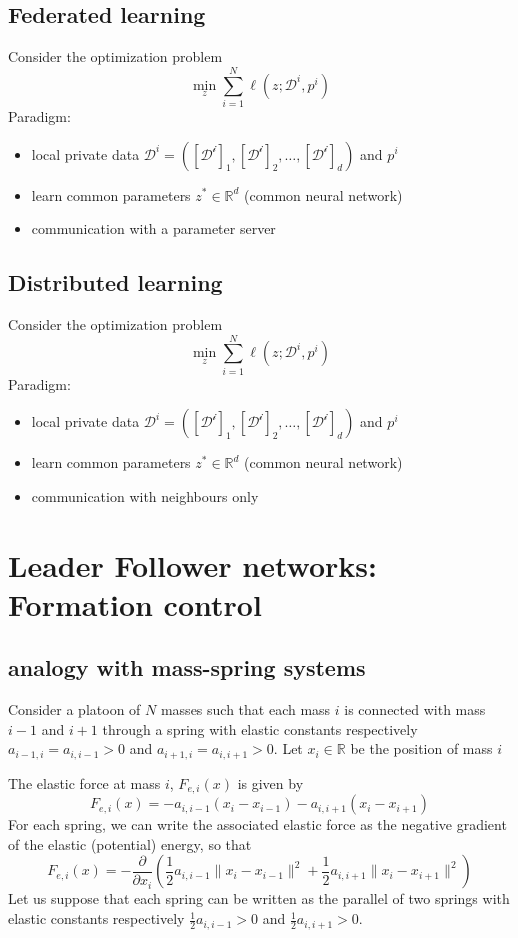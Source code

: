 \documentclass{book}
\newcommand{\R}{\mathbb{R}}
\theoremstyle{theoremv2}
\theoremstyle{defv2}
\theoremstyle{remark}
\theoremstyle{remark}
\theoremstyle{definition}
\theoremstyle{definition}
\begin{document}
\section{Federated learning}
Consider the optimization problem 
\[
    \min_z \displaystyle\sum_{i=1}^{N}\ell(z;\mathcal{D}^i,p^i)
\]
Paradigm:
\begin{itemize}
    \item local private data $\mathcal{D}^i = ([\mathcal{D^i}]_1,[\mathcal{D^i}]_2,\dots,[\mathcal{D^i}]_d)$ and $p^i$
    \item learn common parameters $z^*\in\R^d$ (common neural network)
    \item communication with a parameter server
\end{itemize}

\section{Distributed learning}
Consider the optimization problem 
\[
    \min_z \displaystyle\sum_{i=1}^{N}\ell(z;\mathcal{D}^i,p^i)
\]
Paradigm:
\begin{itemize}
    \item local private data $\mathcal{D}^i = ([\mathcal{D^i}]_1,[\mathcal{D^i}]_2,\dots,[\mathcal{D^i}]_d)$ and $p^i$
    \item learn common parameters $z^*\in\R^d$ (common neural network)
    \item communication with neighbours only
\end{itemize}



\chapter{Leader Follower networks: Formation control}
\section{analogy with mass-spring systems}
Consider a platoon of $N$ masses such that each mass $i$ is connected with mass $i-1$ and $i+1$ through a spring with elastic constants respectively $a_{i-1,i} = a_{i,i-1}>0$ and $a_{i+1,i} = a_{i,i+1}>0$. Let $x_i\in \R$ be the position of mass $i$

The elastic force at mass $i$, $F_{e,i}(x)$ is given by 
\[
    F_{e,i}(x) = -a_{i,i-1}(x_i-x_{i-1})-a_{i,i+1}(x_i-x_{i+1})
\]
For each spring, we can write the associated elastic force as the negative gradient of the elastic (potential) energy, so that 
\[
    F_{e,i}(x) = -\displaystyle\frac{\partial}{\partial x_i}(\displaystyle\frac{1}{2}a_{i,i-1}\|x_i-x_{i-1}\|^2 + \displaystyle\frac{1}{2}a_{i,i+1}\|x_i-x_{i+1}\|^2)
\]
Let us suppose that each spring can be written as the parallel of two springs with elastic constants respectively $\frac{1}{2}a_{i,i-1}>0$ and $\frac{1}{2}a_{i,i+1}>0$.
\end{document}
